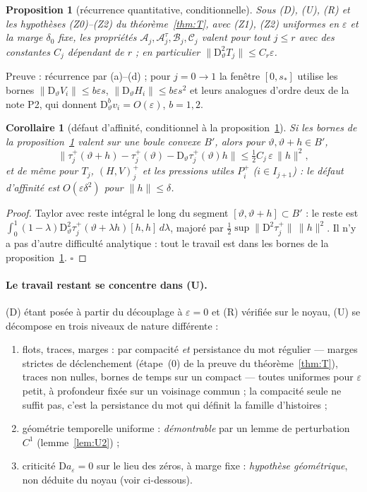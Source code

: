 \documentclass[11pt,a4paper]{article}
\newtheorem{proposition}[theoreme]{Proposition}
\newtheorem{corollaire}[theoreme]{Corollaire}
\theoremstyle{remark}
\newcommand{\vth}{\vartheta}
\newcommand{\D}{\mathrm D}
\begin{document}
\begin{proposition}[récurrence quantitative, conditionnelle]\label{prop:R}
Sous (D), (U), (R) et les hypothèses (Z0)--(Z2) du théorème~\ref{thm:T}, avec (Z1), (Z2) uniformes en $\varepsilon$ et la marge $\delta_0$ fixe, les propriétés $\mathcal A_j,\mathcal A^\tau_j,\mathcal B_j,\mathcal C_j$ valent pour tout $j\le r$ avec des constantes $C_j$ dépendant de $r$ ; en particulier $\lVert\D^2_\vth T_j\rVert\le C_r\varepsilon$.
\end{proposition}
\noindent Preuve : récurrence par (a)--(d) ; pour $j=0\to1$ la fenêtre $[0,s_*]$ utilise les bornes $\lVert\D_\vth V_i\rVert\le b\varepsilon s$, $\lVert\D_\vth H_i\rVert\le b\varepsilon s^2$ et leurs analogues d'ordre deux de la note P2, qui donnent $\D^b_\vth v_i=O(\varepsilon)$, $b=1,2$.

\begin{corollaire}[défaut d'affinité, conditionnel à la proposition~\ref{prop:R}]\label{cor:aff}
Si les bornes de la proposition~\ref{prop:R} valent sur une boule convexe $B'$, alors pour $\vth,\vth+h\in B'$,
\[
\bigl\lVert\tau_j^+(\vth+h)-\tau_j^+(\vth)-\D_\vth\tau_j^+(\vth)h\bigr\rVert\le\tfrac12C_j\,\varepsilon\,\lVert h\rVert^2 ,
\]
et de même pour $T_j$, $(H,V)_j^+$ et les pressions utiles $P_i^+$ ($i\in I_{j+1}$) : le défaut d'affinité est $O(\varepsilon\delta^2)$ pour $\lVert h\rVert\le\delta$.
\end{corollaire}
\begin{proof}
Taylor avec reste intégral le long du segment $[\vth,\vth+h]\subset B'$ : le reste est $\int_0^1(1-\lambda)\D^2_\vth\tau_j^+(\vth+\lambda h)[h,h]\,d\lambda$, majoré par $\frac12\sup\lVert\D^2\tau_j^+\rVert\,\lVert h\rVert^2$. Il n'y a pas d'autre difficulté analytique : tout le travail est dans les bornes de la proposition~\ref{prop:R}. $\square$
\end{proof}

\paragraph{Le travail restant se concentre dans (U).} (D) étant posée à partir du découplage à $\varepsilon=0$ et (R) vérifiée sur le noyau, (U) se décompose en trois niveaux de nature différente :
\begin{enumerate}[label=(U\arabic*),nosep]
\item flots, traces, marges : par compacité \emph{et} persistance du mot régulier --- marges strictes de déclenchement (étape~(0) de la preuve du théorème~\ref{thm:T}), traces non nulles, bornes de temps sur un compact --- toutes uniformes pour $\varepsilon$ petit, à profondeur fixée sur un voisinage commun ; la compacité seule ne suffit pas, c'est la persistance du mot qui définit la famille d'histoires ;
\item géométrie temporelle uniforme : \emph{démontrable} par un lemme de perturbation $C^1$ (lemme~\ref{lem:U2}) ;
\item criticité $\D a_\varepsilon=0$ sur le lieu des zéros, à marge fixe : \emph{hypothèse géométrique}, non déduite du noyau (voir ci-dessous).
\end{enumerate}
\end{document}
